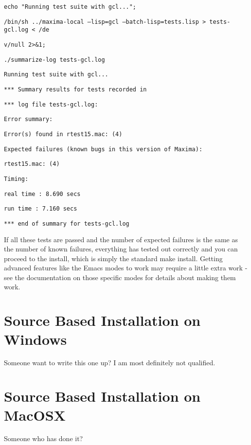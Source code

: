\texttt{echo "Running test suite with gcl..."; \ }

\texttt{/bin/sh ../maxima-local --lisp=gcl --batch-lisp=tests.lisp > tests-gcl.log < /de}

\texttt{v/null 2>\&1; \ }

\texttt{./summarize-log tests-gcl.log}

\texttt{Running test suite with gcl...}

\vspace{2ex}

\texttt{*** Summary results for tests recorded in}

\texttt{*** log file tests-gcl.log:}

\texttt{Error summary:}

\texttt{Error(s) found in rtest15.mac: (4)}

\vspace{2ex}

\texttt{Expected failures (known bugs in this version of Maxima):}

\texttt{rtest15.mac: (4)}

\vspace{2ex}

\texttt{Timing:}

\texttt{real time : 8.690 secs}

\texttt{run time  : 7.160 secs}

\texttt{*** end of summary for tests-gcl.log}


\vspace{3ex}

If all these tests are passed and the number of expected
failures is the same as the number of known failures,
everything has tested out correctly and you can proceed to the
install, which is simply the standard make install.  Getting
advanced features like the Emacs modes to work may require a
little extra work - see the documentation on those specific
modes for details about making them work.

\section{Source Based Installation on Windows}

Someone want to write this one up?  I am most definitely not qualified.

\section{Source Based Installation on MacOSX}

Someone who has done it?
